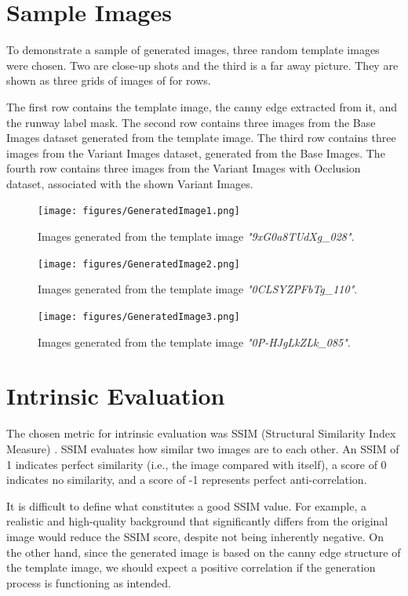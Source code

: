 \section{Sample Images}

To demonstrate a sample of generated images, three random template images were
chosen. Two are close-up shots and the third is a far away picture. They
are shown as three grids of images of for rows.

The first row contains the template image, the canny edge extracted from it,
and the runway label mask. The second row contains three images from the Base
Images dataset generated from the template image. The third row contains three
images from the Variant Images dataset, generated from the Base Images. The
fourth row contains three images from the Variant Images with Occlusion dataset,
associated with the shown Variant Images.

\begin{figure}[htbp]
\centering
\texttt{[image: figures/GeneratedImage1.png]}
  \caption{Images generated from the template image \emph{"9xG0a8TUdXg\_028"}.}
\end{figure}

\begin{figure}[htbp]
\centering
\texttt{[image: figures/GeneratedImage2.png]}
  \caption{Images generated from the template image \emph{"0CLSYZPFbTg\_110"}.}
\end{figure}

\begin{figure}[htbp]
\centering
\texttt{[image: figures/GeneratedImage3.png]}
  \caption{Images generated from the template image \emph{"0P-HJgLkZLk\_085"}.}
\end{figure}

\FloatBarrier
\section{Intrinsic Evaluation}

The chosen metric for intrinsic evaluation was SSIM (Structural Similarity Index Measure) \cite{wang_image_2004}. 
SSIM evaluates how similar two images are to each other. 
An SSIM of 1 indicates perfect similarity (i.e., the image compared with itself), a score of 0 indicates no similarity, and a score of -1 represents perfect anti-correlation.

It is difficult to define what constitutes a good SSIM value. 
For example, a realistic and high-quality background that significantly differs from the original image would reduce the SSIM score, despite not being inherently negative. 
On the other hand, since the generated image is based on the canny edge structure of the template image, we should expect a positive correlation if the generation process is functioning as intended.

